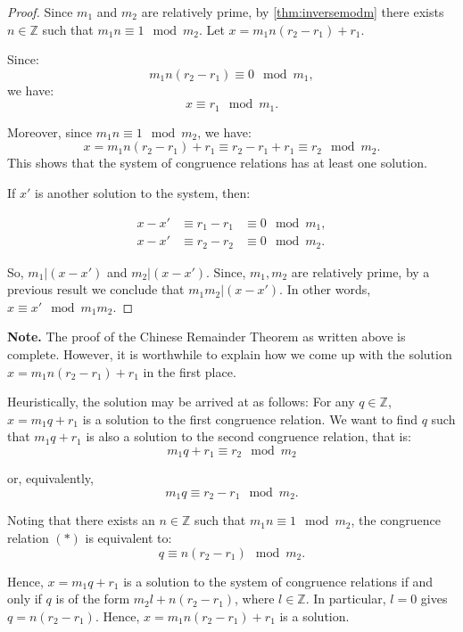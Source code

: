 \documentclass[a4paper,12pt]{report}
\numberwithin{statement}{chapter}
\numberwithin{equation}{chapter}
\numberwithin{section}{chapter}
\numberwithin{subsection}{section}
\begin{document}
\begin{proof}

Since $m_1$ and $m_2$ are relatively prime, by \cref{thm:inversemodm} there exists $n \in \mathbb{Z}$ such that $m_1n \equiv 1 \mod m_2$.
Let $x = m_1n(r_2 - r_1) + r_1$.




Since:
\[
m_1 n (r_2 - r_1) \equiv 0 \mod m_1,
\]
we have:
\[
x \equiv r_1 \mod m_1.
\]

Moreover, since $m_1n \equiv 1 \mod m_2$, we have:
\[
x = m_1n(r_2 - r_1) + r_1 \equiv r_2 - r_1 + r_1 \equiv r_2 \mod m_2.
\]
This shows that the system of congruence relations has at least one solution.




If $x'$ is another solution to the system, then:




\begin{eqnarray*}
x - x' &\equiv r_1 - r_1 &\equiv 0 \mod m_1,\\
x - x' &\equiv r_2 - r_2 &\equiv 0 \mod m_2.
\end{eqnarray*}

So, $m_1 | (x - x')$ and $m_2 | (x - x')$. Since, $m_1, m_2$ are relatively prime,
by a previous result we conclude that $m_1m_2 | (x - x')$. In other words,
$x \equiv x' \mod m_1m_2$.


\end{proof}

 {\bf Note.} 
The proof of the Chinese Remainder Theorem as written above is complete.
However, it is worthwhile to explain
how we come up with the solution $x = m_1n(r_2 - r_1) + r_1$ in the first place.




Heuristically, the solution may be arrived at as follows:
For any $q \in \mathbb{Z}$, $x = m_1 q + r_1$ is a solution to the first congruence relation.
We want to find $q$ such that $m_1 q + r_1$ is also a solution to the second congruence relation, that is:
\[
m_1 q + r_1 \equiv r_2 \mod m_2
\]

or, equivalently,
\[
m_1 q \equiv r_2 - r_1 \mod m_2. \tag{$\ast$}
\]

Noting that there exists an $n \in \mathbb{Z}$ such that $m_1 n \equiv 1 \mod m_2$,
the congruence relation $(\ast)$ is equivalent to:
\[
q \equiv n(r_2 - r_1) \mod m_2.
\]

Hence, $x = m_1 q + r_1$ is a solution to the system of congruence relations
if and only if $q$ is of the form $m_2l + n(r_2 - r_1)$, where $l \in \mathbb{Z}$.
In particular, $l = 0$ gives $q = n(r_2 - r_1)$. Hence, $x = m_1n(r_2 - r_1) + r_1$
is a solution.
\end{document}
